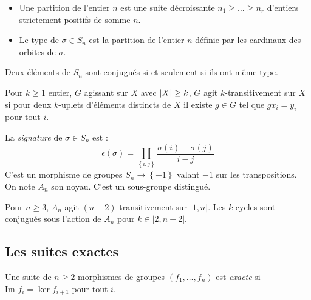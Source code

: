 \documentclass{cours}
\begin{document}
\begin{definition}
    \begin{itemize}
        \item Une partition de l'entier $n$ est une suite décroissante $n_{1} \geq \ldots \geq n_{r}$ d'entiers strictement positifs de somme $n$.
        \item Le type de $\sigma \in S_{n}$ est la partition de l'entier $n$ définie par les cardinaux des orbites de $\sigma$.
    \end{itemize}    
\end{definition}

\begin{proposition}
    Deux éléments de $S_{n}$ sont conjugués si et seulement si ils ont même type.
\end{proposition}

\begin{definition}
    Pour $k\geq 1$ entier, $G$ agissant sur $X$ avec $\left|X\right| \geq k$, $G$ agit $k$-transitivement sur $X$ si pour deux $k$-uplets d'éléments distincts de $X$ il existe $g \in G$ tel que $gx_{i} = y_{i}$ pour tout $i$.
\end{definition}

\begin{definition}
    La \emph{signature} de $\sigma \in S_{n}$ est : 
    \[
        \epsilon(\sigma) = \prod_{\left\{i, j\right\}} \frac{\sigma(i) - \sigma(j)}{i - j}
    \]
    C'est un morphisme de groupes $S_{n} \rightarrow \left\{\pm 1\right\}$ valant $-1$ sur les transpositions. On note $A_{n}$ son noyau. C'est un sous-groupe distingué.
\end{definition}

\begin{proposition}
    Pour $n \geq 3$, $A_{n}$ agit $\left(n - 2\right)$-transitivement sur $\lvert 1, n \rvert$. Les $k$-cycles sont conjugués sous l'action de $A_n$ pour $k \in \lvert 2, n-2 \rvert$.
\end{proposition}

\subsection{Les suites exactes}

\begin{definition}
    Une suite de $n \geq 2$ morphismes de groupes $(f_{1}, \ldots, f_{n})$ est \emph{exacte} si $\text{Im } f_{i} = \ker f_{i+1}$ pour tout $i$.
\end{definition}
\end{document}
